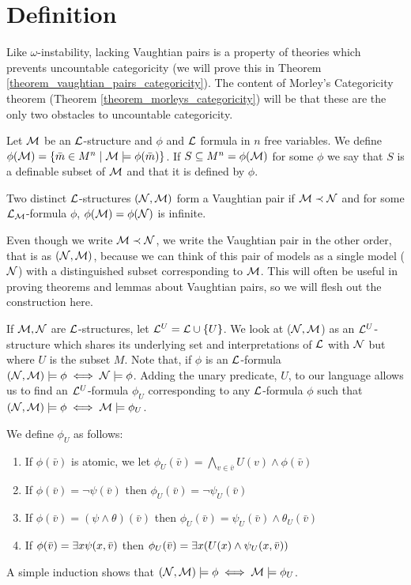 \section{Definition}
Like \(\omega\)-instability, lacking Vaughtian pairs is a property of theories which prevents uncountable categoricity (we will prove this in Theorem \ref{theorem_vaughtian_pairs_categoricity}).
The content of Morley's Categoricity theorem (Theorem \ref{theorem_morleys_categoricity}) will be that these are the only two obstacles to uncountable categoricity. 

\begin{definition}\label{definition_definable_subset}
Let \(\mathcal{M}\) be an \(\mathcal{L}\)-structure and \(\phi\) and \(\mathcal{L}\) formula in \(n\) free variables. 
We define \(\phi(\mathcal{M}) = \{\bar{m} \in M^n \mid \mathcal{M} \models \phi(\bar{m})\}\).
If \(S \subseteq M^n = \phi(\mathcal{M})\) for some \(\phi\) we say that \(S\) is a definable subset of \(\mathcal{M}\) and that it is defined by \(\phi\).
\end{definition}

\begin{definition}\label{definition_vaughtian_pairs}
Two distinct \(\mathcal{L}\)-structures \((\mathcal{N}, \mathcal{M})\) form a Vaughtian pair if \(\mathcal{M} \prec \mathcal{N}\) and for some \(\mathcal{L}_{\mathcal{M}}\)-formula \(\phi\), \(\phi(\mathcal{M}) = \phi(\mathcal{N})\) is infinite. 
\end{definition}

Even though we write \(\mathcal{M} \prec \mathcal{N}\), we write the Vaughtian pair in the other order, that is as \((\mathcal{N}, \mathcal{M})\), because we can think of this pair of models as a single model (\(\mathcal{N}\)) with a distinguished subset corresponding to \(\mathcal{M}\).
This will often be useful in proving theorems and lemmas about Vaughtian pairs, so we will flesh out the construction here. 

If \(\mathcal{M}, \mathcal{N}\) are \(\mathcal{L}\)-structures, let  \(\mathcal{L}^U = \mathcal{L} \cup \{U\}\). 
We look at (\(\mathcal{N}, \mathcal{M}\)) as an \(\mathcal{L}^U\)-structure which shares its underlying set and interpretations of \(\mathcal{L}\) with \(\mathcal{N}\) but where \(U\) is the subset \(M\). 
Note that, if \(\phi\) is an \(\mathcal{L}\)-formula \((\mathcal{N}, \mathcal{M}) \models \phi \iff \mathcal{N} \models \phi\).
Adding the unary predicate, \(U\), to our language allows us to find an \(\mathcal{L}^U\)-formula \(\phi_U\) corresponding to any \(\mathcal{L}\)-formula \(\phi\) such that \((\mathcal{N}, \mathcal{M}) \models \phi \iff \mathcal{M} \models \phi_U\).

We define \(\phi_U\) as follows:
\begin{enumerate}
\item If \(\phi(\bar{v})\) is atomic, we let \(\phi_U(\bar{v}) = \bigwedge_{v \in \bar{v}}U(v) \land \phi(\bar{v})\)
\item If \(\phi(\bar{v}) = \neg \psi(\bar{v})\) then \(\phi_U(\bar{v}) = \neg \psi_U(\bar{v})\)
\item If \(\phi(\bar{v}) = (\psi \land \theta)(\bar{v})\) then \(\phi_U(\bar{v}) = \psi_U(\bar{v}) \land \theta_U(\bar{v})\)
\item If \(\phi(\bar{v}) = \exists x \psi(x, \bar{v})\) then \(\phi_U(\bar{v}) = \exists x (U(x) \land \psi_U(x, \bar{v}))\)
\end{enumerate}
A simple induction shows that \((\mathcal{N}, \mathcal{M}) \models \phi \iff \mathcal{M} \models \phi_U\).

